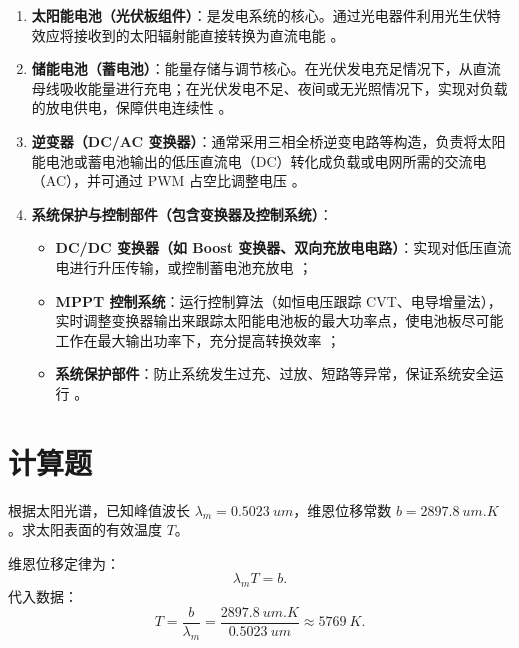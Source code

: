 \begin{solution}
\begin{enumerate}
\item \textbf{太阳能电池（光伏板组件）}：是发电系统的核心。通过光电器件利用光生伏特效应将接收到的太阳辐射能直接转换为直流电能 。
\item \textbf{储能电池（蓄电池）}：能量存储与调节核心。在光伏发电充足情况下，从直流母线吸收能量进行充电；在光伏发电不足、夜间或无光照情况下，实现对负载的放电供电，保障供电连续性 。
\item \textbf{逆变器（DC/AC 变换器）}：通常采用三相全桥逆变电路等构造，负责将太阳能电池或蓄电池输出的低压直流电（DC）转化成负载或电网所需的交流电（AC），并可通过 PWM 占空比调整电压 。
\item \textbf{系统保护与控制部件（包含变换器及控制系统）}：
\begin{itemize}
\item \textbf{DC/DC 变换器（如 Boost 变换器、双向充放电电路）}：实现对低压直流电进行升压传输，或控制蓄电池充放电 ；
\item \textbf{MPPT 控制系统}：运行控制算法（如恒电压跟踪 CVT、电导增量法），实时调整变换器输出来跟踪太阳能电池板的最大功率点，使电池板尽可能工作在最大输出功率下，充分提高转换效率 ；
\item \textbf{系统保护部件}：防止系统发生过充、过放、短路等异常，保证系统安全运行 。
\end{itemize}
\end{enumerate}
\end{solution}

\section{计算题}

\begin{problem}[维恩位移定律求太阳表面有效温度]\label{exer:calc_04_solar_p014_01}
根据太阳光谱，已知峰值波长 \(\lambda_m = \qty{0.5023}{um}\)，维恩位移常数 \(b = \qty{2897.8}{um.K}\)。求太阳表面的有效温度 \(T\)。
\end{problem}

\begin{solution}
维恩位移定律为：
\begin{equation}
\lambda_m T = b.
\end{equation}
代入数据：
\begin{equation}
T = \frac{b}{\lambda_m}
  = \frac{\qty{2897.8}{um.K}}{\qty{0.5023}{um}}
  \approx \qty{5769}{K}.
\end{equation}
\end{solution}


